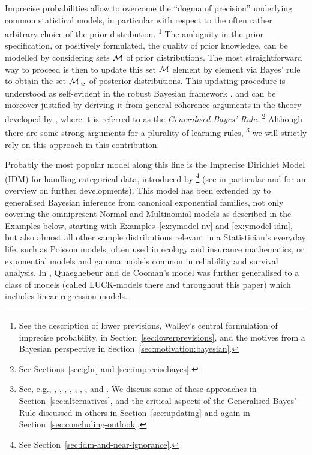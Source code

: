 
Imprecise probabilities allow to overcome the ``dogma of
precision'' \parencite[\S 5]{1991:walley}
underlying common statistical models, in particular with respect to the often rather arbitrary
choice of the prior distribution.%
\footnote{See the description of lower previsions,
Walley's central formulation of imprecise probability, in Section~\ref{sec:lowerprevisions},
and the motives from a Bayesian perspective in Section~\ref{sec:motivation:bayesian}.}
The ambiguity in the prior
specification, or positively formulated, the quality of prior
knowledge, can be modelled by considering sets ${\cal M}$ of prior distributions.
The most straightforward way to proceed is then to update this set ${\cal M}$
element by element via Bayes' rule %
to obtain the set ${\cal M}_{|{\bm x}}$ of posterior distributions. This
updating procedure is understood as self-evident in the robust
Bayesian framework \parencite[e.g.,][]{2000:rios}, and can be moreover
justified by deriving it from general coherence arguments in the
theory developed by \textcite{1991:walley}, where it is referred to as the \emph{Generalised Bayes' Rule}.%
\footnote{See Sections~\ref{sec:gbr} and \ref{sec:imprecisebayes}.}
Although there are some
strong arguments for a plurality of learning rules,%
\footnote{\label{foot:learningrules}See, e.g.,
\textcite{2009:Coolen:Augustin}, \textcite{2007:weichselberger}, \textcite{2007a:cattaneo},
\textcite{2007:held}, \textcite{2007:held-isipta07}, \textcite{2009:Coolen:Augustin},
\textcite{2004:augustin}, and \textcite{2003:augustin}.
We discuss some of these approaches in Section~\ref{sec:alternatives},
and the critical aspects of the Generalised Bayes' Rule discussed in others in Section~\ref{sec:updating}
and again in Section~\ref{sec:concluding-outlook}.} we
will strictly rely on this approach in this contribution.


Probably the most popular model along this line is the Imprecise
Dirichlet Model (IDM) for handling categorical data, introduced by
\textcite{1996:walley::idm}%
\footnote{See Section~\ref{sec:idm-and-near-ignorance}.}
(see in particular \textcite{2005:bernard} and \textcite{2009:bernard} %
for an overview on further developments). This model has been
extended by \textcite{2005:quaeghebeurcooman} to generalised Bayesian inference from
canonical exponential families, not only covering the
omnipresent Normal and Multinomial models as described in the
Examples below, starting with Examples~\ref{ex:ymodel-nv} and \ref{ex:ymodel-idm},
but also almost all other sample distributions relevant in a Statistician's everyday life, such as
Poisson models, often used in ecology and insurance mathematics, or
exponential models and gamma models common in reliability and
survival analysis. In \textcite{Walter2007a}, Quaeghebeur and de
Cooman's model was further generalised to a class of models (called
LUCK-models there and throughout this paper) which includes
linear regression models.

